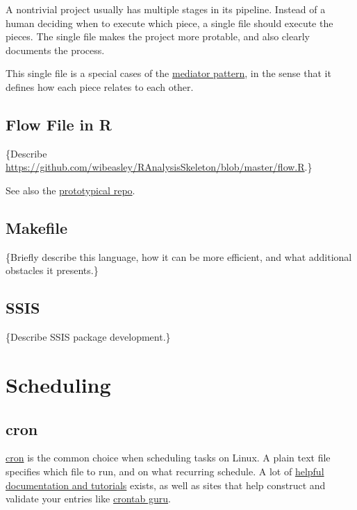 \documentclass[
]{book}
\begin{document}
A nontrivial project usually has multiple stages in its pipeline. Instead of a human deciding when to execute which piece, a single file should execute the pieces. The single file makes the project more protable, and also clearly documents the process.

This single file is a special cases of the \href{https://en.wikipedia.org/wiki/Mediator_pattern}{mediator pattern}, in the sense that it defines how each piece relates to each other.

\hypertarget{automation-flow}{%
\subsection{Flow File in R}\label{automation-flow}}

\{Describe \url{https://github.com/wibeasley/RAnalysisSkeleton/blob/master/flow.R}.\}

See also the \protect\hyperlink{repo-flow}{prototypical repo}.

\hypertarget{automation-makefile}{%
\subsection{Makefile}\label{automation-makefile}}

\{Briefly describe this language, how it can be more efficient, and what additional obstacles it presents.\}

\hypertarget{automation-ssis}{%
\subsection{SSIS}\label{automation-ssis}}

\{Describe SSIS package development.\}

\hypertarget{automation-scheduling}{%
\section{Scheduling}\label{automation-scheduling}}

\hypertarget{automation-cron}{%
\subsection{cron}\label{automation-cron}}

\href{https://en.wikipedia.org/wiki/Cron}{cron} is the common choice when scheduling tasks on Linux. A plain text file specifies which file to run, and on what recurring schedule. A lot of \href{https://www.computerhope.com/unix/ucrontab.htm}{helpful documentation and tutorials} exists, as well as sites that help construct and validate your entries like \href{https://crontab.guru/}{crontab guru}.
\end{document}
